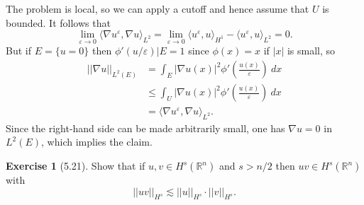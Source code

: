 \documentclass[10pt]{article}
\newcommand{\RR}{\mathbb{R}}
\theoremstyle{definition}
\newtheorem{exer}{Exercise}
\begin{document}
The problem is local, so we can apply a cutoff and hence assume that $U$ is bounded.
It follows that
$$\lim_{\varepsilon \to 0} \langle \nabla u^\varepsilon, \nabla u\rangle_{L^2} = \lim_{\varepsilon \to 0} \langle u^\varepsilon, u\rangle_{H^1} - \langle u^\varepsilon, u\rangle_{L^2} = 0.$$
But if $E = \{u = 0\}$ then $\phi'(u/\varepsilon)|E = 1$ since $\phi(x) = x$ if $|x|$ is small, so
\begin{align*}||\nabla u||_{L^2(E)} &= \int_E |\nabla u(x)|^2 \phi'\left(\frac{u(x)}{\varepsilon}\right)~dx \\
&\leq \int_U |\nabla u(x)|^2 \phi'\left(\frac{u(x)}{\varepsilon}\right)~dx\\
&= \langle \nabla u^\varepsilon, \nabla u\rangle_{L^2}.
\end{align*}
Since the right-hand side can be made arbitrarily small, one has $\nabla u = 0$ in $L^2(E)$, which implies the claim.

\begin{exer}[5.21]
Show that if $u, v \in H^s(\RR^n)$ and $s > n/2$ then $uv \in H^s(\RR^n)$ with
$$||uv||_{H^s} \lesssim ||u||_{H^s} \cdot ||v||_{H^s}.$$
\end{exer}
\end{document}
